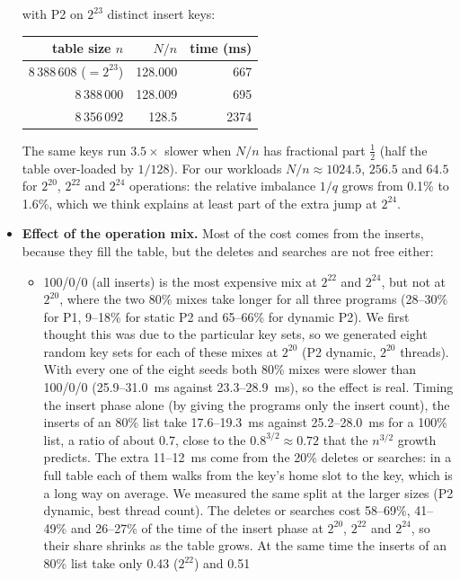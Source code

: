 \begin{itemize}
  with P2 on $2^{23}$ distinct insert keys:
  \begin{center}\small
  \begin{tabular}{rrr}\toprule
  table size $n$ & $N/n$ & time (ms)\\\midrule
  8\,388\,608 ($=2^{23}$) & 128.000 & 667\\
  8\,388\,000 & 128.009 & 695\\
  8\,356\,092 & 128.5 & 2374\\\bottomrule
  \end{tabular}
  \end{center}
  The same keys run $3.5\times$ slower when $N/n$ has fractional part $\frac12$ (half the
  table over-loaded by $1/128$). For our workloads $N/n\approx1024.5$, $256.5$ and $64.5$
  for $2^{20}$, $2^{22}$ and $2^{24}$ operations: the relative imbalance $1/q$ grows
  from 0.1\% to 1.6\%, which we think explains at least part of the extra jump at
  $2^{24}$.
\item \textbf{Effect of the operation mix.} Most of the cost comes from the inserts,
  because they fill the table, but the deletes and searches are not free either:
  \begin{itemize}
  \item 100/0/0 (all inserts) is the most expensive mix at $2^{22}$ and $2^{24}$, but
    not at $2^{20}$, where the two 80\% mixes take longer for all three programs
    (28--30\% for P1, 9--18\% for static P2 and 65--66\% for dynamic P2). We first thought this was due to the particular key sets, so we
    generated eight random key sets for each of these mixes at $2^{20}$ (P2 dynamic,
    $2^{20}$ threads). With every one of the eight seeds both 80\% mixes were slower than
    100/0/0 (25.9--31.0~ms against 23.3--28.9~ms), so the effect is real. Timing the insert phase alone (by giving the
    programs only the insert count), the inserts of an 80\% list take 17.6--19.3~ms
    against 25.2--28.0~ms for a 100\% list, a ratio of about 0.7, close to the
    $0.8^{3/2}\approx0.72$ that the $n^{3/2}$ growth predicts. The extra 11--12~ms
    come from the 20\% deletes or searches: in a full table each of them walks from
    the key's home slot to the key, which is a long way on average. We measured the
    same split at the larger sizes (P2 dynamic, best thread count). The deletes or
    searches cost 58--69\%, 41--49\% and 26--27\% of the time of the insert phase
    at $2^{20}$, $2^{22}$ and $2^{24}$, so their share shrinks as the table grows. At
    the same time the inserts of an 80\% list take only 0.43 ($2^{22}$) and 0.51

\end{itemize}
\end{itemize}
